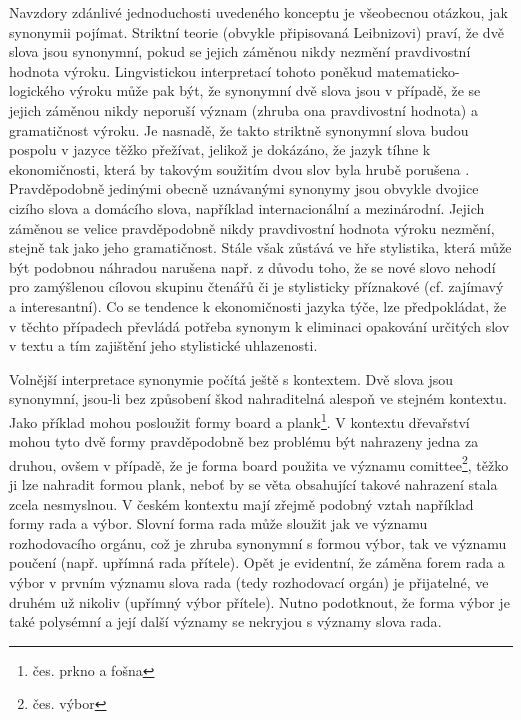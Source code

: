 \documentclass[a4paper, 11pt, oneside]{book}
\newcommand\ex{\textsf}
\begin{document}
					Navzdory zdánlivé jednoduchosti uvedeného konceptu je všeobecnou otázkou, jak synonymii pojímat. Striktní teorie (obvykle připisovaná Leibnizovi) praví, že dvě slova jsou synonymní, pokud se jejich záměnou nikdy nezmění pravdivostní hodnota výroku. Lingvistickou interpretací tohoto poněkud matematicko-logického výroku může pak být, že synonymní dvě slova jsou v případě, že se jejich záměnou nikdy neporuší význam (zhruba ona pravdivostní hodnota) a gramatičnost výroku. Je nasnadě, že takto striktně synonymní slova budou pospolu v jazyce těžko přežívat, jelikož je dokázáno, že jazyk tíhne k ekonomičnosti, která by takovým soužitím dvou slov byla hrubě porušena \parencite{Lotko2003}. Pravděpodobně jedinými obecně uznávanými synonymy jsou obvykle dvojice cizího slova a domácího slova, například \ex{internacionální} a \ex{mezinárodní}. Jejich záměnou se velice pravděpodobně nikdy pravdivostní hodnota výroku nezmění, stejně tak jako jeho gramatičnost. Stále však zůstává ve hře stylistika, která může být podobnou náhradou narušena např. z důvodu toho, že se nové slovo nehodí pro zamýšlenou cílovou skupinu čtenářů či je stylisticky příznakové (cf. \ex{zajímavý} a \ex{interesantní}). Co se tendence k ekonomičnosti jazyka týče, lze předpokládat, že v těchto případech převládá potřeba synonym k eliminaci opakování určitých slov v textu a tím zajištění jeho stylistické uhlazenosti. 

					Volnější interpretace synonymie počítá ještě s kontextem. Dvě slova jsou synonymní, jsou-li bez způsobení škod nahraditelná alespoň ve stejném kontextu. Jako příklad mohou posloužit formy \ex{board} a \ex{plank}\footnote{čes. \ex{prkno} a \ex{fošna}}. V kontextu dřevařství mohou tyto dvě formy pravděpodobně bez problému být nahrazeny jedna za druhou, ovšem v případě, že je forma \ex{board} použita ve významu \ex{comittee}\footnote{čes. \ex{výbor}}, těžko ji lze nahradit formou \ex{plank}, neboť by se věta obsahující takové nahrazení stala zcela nesmyslnou. \parencite{miller1990introduction} V českém kontextu mají zřejmě podobný vztah například formy \ex{rada} a \ex{výbor}. Slovní forma \ex{rada} může sloužit jak ve významu rozhodovacího orgánu, což je zhruba synonymní s formou \ex{výbor}, tak ve významu poučení (např. \ex{upřímná rada přítele}). Opět je evidentní, že záměna forem \ex{rada} a \ex{výbor} v prvním významu slova \ex{rada} (tedy rozhodovací orgán) je přijatelné, ve druhém už nikoliv (\ex{upřímný výbor přítele}). Nutno podotknout, že forma \ex{výbor} je také polysémní a její další významy se nekryjou s významy slova \ex{rada}. \parencite{Havranek1989}
\end{document}
